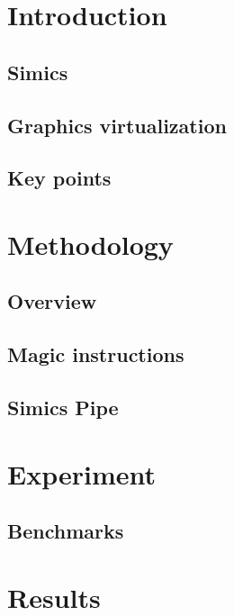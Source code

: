 \documentclass{beamer}
\begin{document}
	

	\section{Introduction}
	\subsection{Simics}
	
	\subsection{Graphics virtualization}
	
	\subsection{Key points}
	

	\section{Methodology}
	\subsection{Overview}
	
	\subsection{Magic instructions}
	
	\subsection{Simics Pipe}
	

	\section{Experiment}
	\subsection{Benchmarks}
	

	\section{Results}
\end{document}
